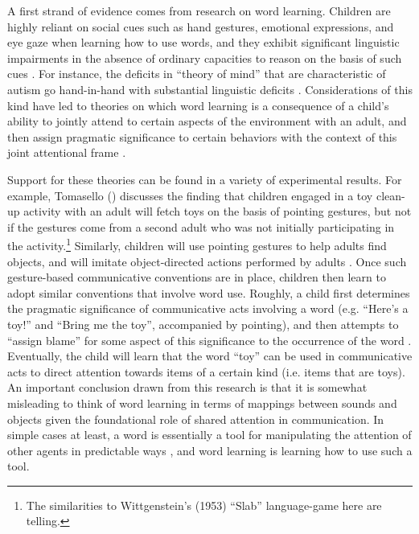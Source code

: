 A first strand of evidence comes from research on word learning. Children are highly reliant on social cues such as hand gestures, emotional expressions, and eye gaze when learning how to use words, and they exhibit significant linguistic impairments in the absence of ordinary capacities to reason on the basis of such cues \citep[][p. 1099-1100]{Bloom:2001}. For instance, the deficits in ``theory of mind'' that are characteristic of autism go hand-in-hand with substantial linguistic deficits \citep{Bloom:2001,Miller:2006,Harley:2014}. Considerations of this kind have led to theories on which word learning is a consequence of a child's ability to jointly attend to certain aspects of the environment with an adult, and then assign pragmatic significance to certain behaviors with the context of this joint attentional frame \citep{Tomasello:2005,Miller:2006}. 

Support for these theories can be found in a variety of experimental results. For example, Tomasello (\citeyear{Tomasello:2005}) discusses the finding that children engaged in a toy clean-up activity with an adult will fetch toys on the basis of pointing gestures, but not if the gestures come from a second adult who was not initially participating in the activity.\footnote{The similarities to Wittgenstein's (1953) ``Slab'' language-game here are telling.} Similarly, children will use pointing gestures to help adults find objects, and will imitate object-directed actions performed by adults \citep{Tomasello:2001}. Once such gesture-based communicative conventions are in place, children then learn to adopt similar conventions that involve word use. Roughly, a child first determines the pragmatic significance of communicative acts involving a word (e.g. ``Here's a toy!'' and ``Bring me the toy'', accompanied by pointing), and then attempts to ``assign blame'' for some aspect of this significance to the occurrence of the word \citep[][p. 73]{Tomasello:2005}. Eventually, the child will learn that the word ``toy'' can be used in communicative acts to direct attention towards items of a certain kind (i.e. items that are toys). An important conclusion drawn from this research is that it is somewhat misleading to think of word learning in terms of mappings between sounds and objects given the foundational role of shared attention in communication. In simple cases at least, a word is essentially a tool for manipulating the attention of other agents in predictable ways \citep{Tomasello:2001}, and word learning is learning how to use such a tool. 

